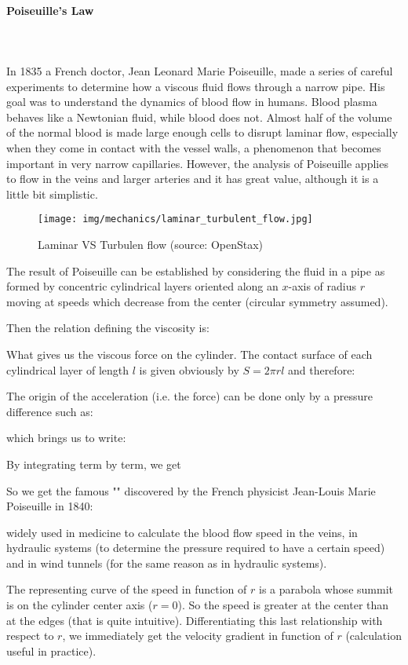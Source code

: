 	\paragraph{Poiseuille's Law}\mbox{}\\\\
	In 1835 a French doctor, Jean Leonard Marie Poiseuille, made a series of careful experiments to determine how a viscous fluid flows through a narrow pipe. His goal was to understand the dynamics of blood flow in humans. Blood plasma behaves like a Newtonian fluid, while blood does not. Almost half of the volume of the normal blood is made large enough cells to disrupt laminar flow, especially when they come in contact with the vessel walls, a phenomenon that becomes important in very narrow capillaries. However, the analysis of Poiseuille applies to flow in the veins and larger arteries and it has great value, although it is a little bit simplistic.
 	\begin{figure}[H]
		\centering
		\texttt{[image: img/mechanics/laminar\_turbulent\_flow.jpg]}	
		\caption{Laminar VS Turbulen flow (source: OpenStax)}
	\end{figure}
	The result of Poiseuille can be established by considering the fluid in a pipe as formed by concentric cylindrical layers oriented along an $x$-axis of radius $r$ moving at speeds which decrease from the center (circular symmetry assumed).

	Then the relation defining the viscosity is:
	
	What gives us the viscous force on the cylinder. The contact surface of each cylindrical layer of length $l$ is given obviously by $S=2\pi r l$ and therefore:
	
	The origin of the acceleration (i.e. the force) can be done only by a pressure difference such as:
	
	which brings us to write:
	
	By integrating term by term, we get
	
	So we get the famous "" discovered by the French physicist Jean-Louis Marie Poiseuille in 1840:
	
	widely used in medicine to calculate the blood flow speed in the veins, in hydraulic systems (to determine the pressure required to have a certain speed) and in wind tunnels (for the same reason as in hydraulic systems).
	
	The representing curve of the speed in function of $r$ is a parabola whose summit is on the cylinder center axis ($r=0$). So the speed is greater at the center than at the edges (that is quite intuitive). Differentiating this last relationship with respect to $r$, we immediately get the velocity gradient in function of $r$ (calculation useful in practice).

